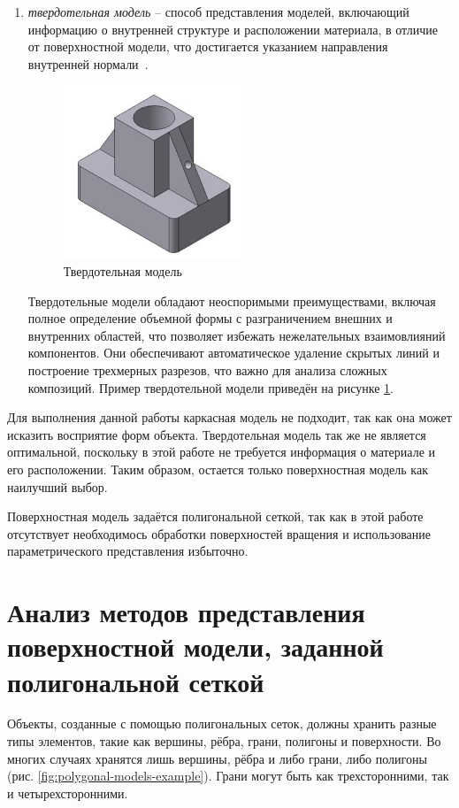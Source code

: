 \begin{enumerate}
	\item \textit{твердотельная модель} -- способ представления моделей, включающий информацию о внутренней структуре и расположении материала, в отличие от поверхностной модели, что достигается указанием направления внутренней нормали~\cite{lit1}.
	\begin{figure}[h] 
		\centering
		\includegraphics[width=0.5\textwidth]{images/solidum-statu-models.png}
		\caption{Твердотельная модель} 
		\label{fig:solidum-statu-models} 
	\end{figure}
	Твердотельные модели обладают неоспоримыми преимуществами, включая полное определение объемной формы с разграничением внешних и внутренних областей, что позволяет избежать нежелательных взаимовлияний компонентов. Они обеспечивают автоматическое удаление скрытых линий и построение трехмерных разрезов, что важно для анализа сложных композиций. Пример твердотельной модели приведён на рисунке \ref{fig:solidum-statu-models}.
\end{enumerate}
	
Для выполнения данной работы каркасная модель не подходит, так как она может исказить восприятие форм объекта. Твердотельная модель так же не является оптимальной, поскольку в этой работе не требуется информация о материале и его расположении. Таким образом, остается только поверхностная модель как наилучший выбор. 

Поверхностная модель задаётся полигональной сеткой, так как в этой работе отсутствует необходимось обработки поверхностей вращения и использование параметрического представления избыточно.

\section{Анализ методов представления поверхностной модели, заданной полигональной сеткой}

Объекты, созданные с помощью полигональных сеток, должны хранить разные типы элементов, такие как вершины, рёбра, грани, полигоны и поверхности. Во многих случаях хранятся лишь вершины, рёбра и либо грани, либо полигоны (рис. \ref{fig:polygonal-models-example}). Грани могут быть как трехсторонними, так и четырехсторонними.

